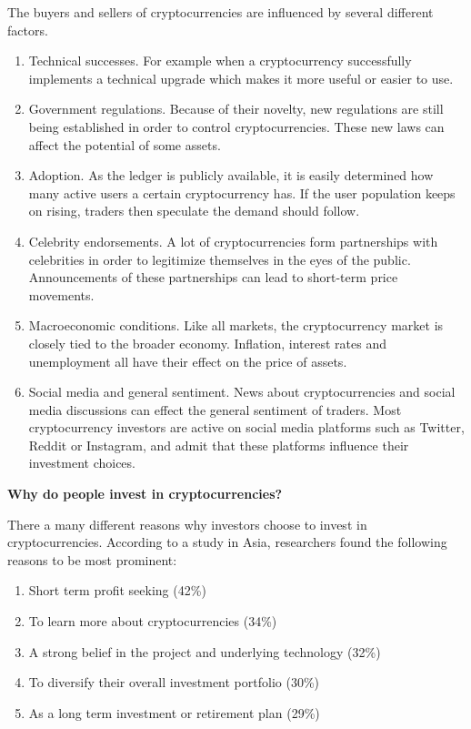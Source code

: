 The buyers and sellers of cryptocurrencies are influenced by several different factors.
\begin{enumerate}
    \item 	Technical successes. For example when a cryptocurrency successfully implements a technical upgrade which makes it more useful or easier to use.~\autocite{Lewis2018a}
    \item	Government regulations. Because of their novelty, new regulations are still being established in order to control cryptocurrencies. These new laws can affect the potential of some assets. ~\autocite{Lewis2018a}
    \item	Adoption. As the ledger is publicly available, it is easily determined how many active users a certain cryptocurrency has. If the user population keeps on rising, traders then speculate the demand should follow. ~\autocite{Lewis2018a}
    \item	Celebrity endorsements. A lot of cryptocurrencies form partnerships with celebrities in order to legitimize themselves in the eyes of the public. Announcements of these partnerships can lead to short-term price movements.~\autocite{Lewis2018a} 
    \item	Macroeconomic conditions. Like all markets, the cryptocurrency market is closely tied to the broader economy. Inflation, interest rates and unemployment all have their effect on the price of assets.~\autocite{Bouronikos2022} 
    \item	Social media and general sentiment. News about cryptocurrencies and social media discussions can effect the general sentiment of traders. Most cryptocurrency investors are active on social media platforms such as Twitter, Reddit or Instagram, and admit that these platforms influence their investment choices.~\autocite{Lewis2018a} 
\end{enumerate}

\textbf{Why do people invest in cryptocurrencies? } \bigbreak

There a many different reasons why investors choose to invest in cryptocurrencies. According to a study in Asia, researchers found the following reasons to be most prominent:

\begin{enumerate}
    \item Short term profit seeking (42\%)
    \item To learn more about cryptocurrencies (34\%)
    \item A strong belief in the project and underlying technology (32\%)
    \item To diversify their overall investment portfolio (30\%)
    \item As a long term investment or retirement plan (29\%)~\autocite{OECD2019}
\end{enumerate} \bigbreak



